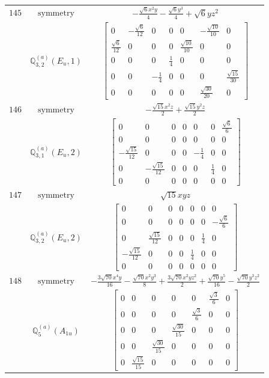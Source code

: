 \documentclass[fleqn,8pt,landscape]{jsarticle}
\begin{document}
\begin{longtable}{ccc}
$ 145 $ & $ \text{symmetry} $ & $ - \frac{\sqrt{6} x^{2} y}{4} - \frac{\sqrt{6} y^{3}}{4} + \sqrt{6} y z^{2} $ \\
$  $ & $ \mathbb{Q}_{3,2}^{(a)}(E_{u},1) $ & $ \begin{bmatrix} 0 & - \frac{\sqrt{6}}{12} & 0 & 0 & 0 & - \frac{\sqrt{10}}{10} & 0 \\ \frac{\sqrt{6}}{12} & 0 & 0 & 0 & \frac{\sqrt{10}}{10} & 0 & 0 \\ 0 & 0 & 0 & \frac{1}{4} & 0 & 0 & 0 \\ 0 & 0 & - \frac{1}{4} & 0 & 0 & 0 & \frac{\sqrt{15}}{30} \\ 0 & 0 & 0 & 0 & 0 & \frac{\sqrt{30}}{20} & 0 \end{bmatrix} $ \\ \hline
$ 146 $ & $ \text{symmetry} $ & $ - \frac{\sqrt{15} x^{2} z}{2} + \frac{\sqrt{15} y^{2} z}{2} $ \\
$  $ & $ \mathbb{Q}_{3,1}^{(a)}(E_{u},2) $ & $ \begin{bmatrix} 0 & 0 & 0 & 0 & 0 & 0 & \frac{\sqrt{6}}{6} \\ 0 & 0 & 0 & 0 & 0 & 0 & 0 \\ - \frac{\sqrt{15}}{12} & 0 & 0 & 0 & - \frac{1}{4} & 0 & 0 \\ 0 & - \frac{\sqrt{15}}{12} & 0 & 0 & 0 & \frac{1}{4} & 0 \\ 0 & 0 & 0 & 0 & 0 & 0 & 0 \end{bmatrix} $ \\ \hline
$ 147 $ & $ \text{symmetry} $ & $ \sqrt{15} x y z $ \\
$  $ & $ \mathbb{Q}_{3,2}^{(a)}(E_{u},2) $ & $ \begin{bmatrix} 0 & 0 & 0 & 0 & 0 & 0 & 0 \\ 0 & 0 & 0 & 0 & 0 & 0 & - \frac{\sqrt{6}}{6} \\ 0 & \frac{\sqrt{15}}{12} & 0 & 0 & 0 & \frac{1}{4} & 0 \\ - \frac{\sqrt{15}}{12} & 0 & 0 & 0 & \frac{1}{4} & 0 & 0 \\ 0 & 0 & 0 & 0 & 0 & 0 & 0 \end{bmatrix} $ \\ \hline
$ 148 $ & $ \text{symmetry} $ & $ - \frac{3 \sqrt{70} x^{4} y}{16} - \frac{\sqrt{70} x^{2} y^{3}}{8} + \frac{3 \sqrt{70} x^{2} y z^{2}}{2} + \frac{\sqrt{70} y^{5}}{16} - \frac{\sqrt{70} y^{3} z^{2}}{2} $ \\
$  $ & $ \mathbb{Q}_{5}^{(a)}(A_{1u}) $ & $ \begin{bmatrix} 0 & 0 & 0 & 0 & 0 & \frac{\sqrt{3}}{6} & 0 \\ 0 & 0 & 0 & 0 & \frac{\sqrt{3}}{6} & 0 & 0 \\ 0 & 0 & 0 & \frac{\sqrt{30}}{15} & 0 & 0 & 0 \\ 0 & 0 & \frac{\sqrt{30}}{15} & 0 & 0 & 0 & 0 \\ 0 & \frac{\sqrt{15}}{15} & 0 & 0 & 0 & 0 & 0 \end{bmatrix} $ \\ \hline

\end{longtable}
\end{document}
